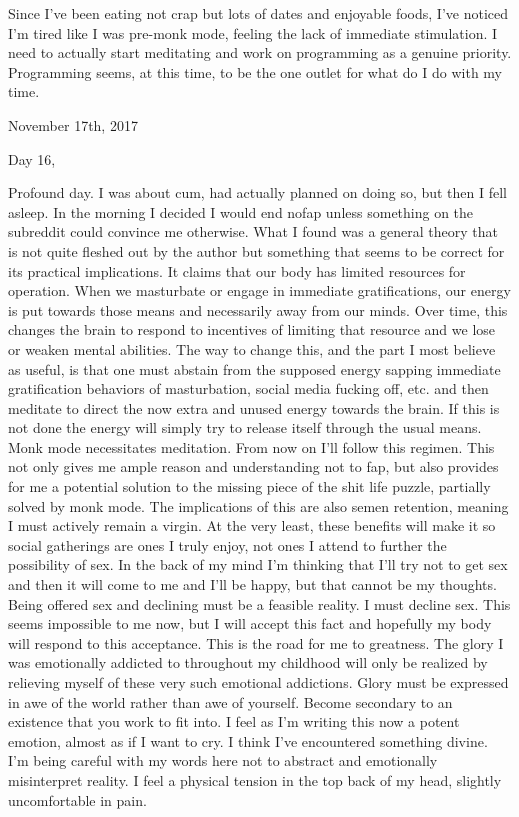 Since I've been eating not crap but lots of dates and enjoyable foods,
I've noticed I'm tired like I was pre-monk mode, feeling the lack of
immediate stimulation. I need to actually start meditating and work on
programming as a genuine priority. Programming seems, at this time, to
be the one outlet for what do I do with my time.

\bigskip
\bigskip
November 17th, 2017

Day 16,

Profound day. I was about cum, had actually planned on doing so, but
then I fell asleep. In the morning I decided I would end nofap unless
something on the subreddit could convince me otherwise. What I found was
a general theory that is not quite fleshed out by the author but
something that seems to be correct for its practical implications. It
claims that our body has limited resources for operation. When we
masturbate or engage in immediate gratifications, our energy is put
towards those means and necessarily away from our minds. Over time, this
changes the brain to respond to incentives of limiting that resource and
we lose or weaken mental abilities. The way to change this, and the part
I most believe as useful, is that one must abstain from the supposed
energy sapping immediate gratification behaviors of masturbation, social
media fucking off, etc. and then meditate to direct the now extra and
unused energy towards the brain. If this is not done the energy will
simply try to release itself through the usual means. Monk mode
necessitates meditation. From now on I'll follow this regimen. This not
only gives me ample reason and understanding not to fap, but also
provides for me a potential solution to the missing piece of the shit
life puzzle, partially solved by monk mode. The implications of this are
also semen retention, meaning I must actively remain a virgin. At the
very least, these benefits will make it so social gatherings are ones I
truly enjoy, not ones I attend to further the possibility of sex. In the
back of my mind I'm thinking that I'll try not to get sex and then it
will come to me and I'll be happy, but that cannot be my thoughts. Being
offered sex and declining must be a feasible reality. I must decline
sex. This seems impossible to me now, but I will accept this fact and
hopefully my body will respond to this acceptance. This is the road for
me to greatness. The glory I was emotionally addicted to throughout my
childhood will only be realized by relieving myself of these very such
emotional addictions. Glory must be expressed in awe of the world rather
than awe of yourself. Become secondary to an existence that you work to
fit into. I feel as I'm writing this now a potent emotion, almost as if
I want to cry. I think I've encountered something divine. I'm being
careful with my words here not to abstract and emotionally misinterpret
reality. I feel a physical tension in the top back of my head, slightly
uncomfortable in pain.

